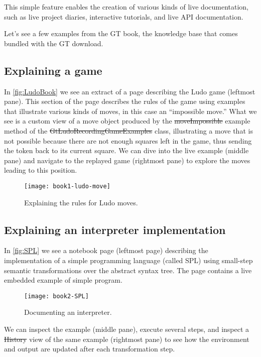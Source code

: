 \documentclass[acmsmall,screen,authorversion,nonacm]{acmart} %
\begin{document}
This simple feature enables the creation of various kinds of live documentation, such as live project diaries, interactive tutorials, and live API documentation.

Let's see a few examples from the GT book, the knowledge base that comes bundled with the GT download.

\subsection{Explaining a game}
In \autoref{fig:LudoBook} we see an extract of a page describing the Ludo game (leftmost pane).
This section of the page describes the rules of the game using examples that illustrate various kinds of moves, in this case an ``impossible move.''
What we see is a custom view of a move object produced by the \st{moveImpossible} example method of the \st{GtLudoRecordingGameExamples} class, illustrating a move that is not possible because there are not enough squares left in the game, thus sending the token back to its current square.
We can dive into the live example (middle pane) and navigate to the replayed game (rightmost pane) to explore the moves leading to this position.
\begin{figure}[h]
  \texttt{[image: book1-ludo-move]}
  \caption{Explaining the rules for Ludo moves.}
  \label{fig:LudoBook}
\end{figure}

\subsection{Explaining an interpreter implementation}
In \autoref{fig:SPL} we see a notebook page (leftmost page) describing the implementation of a simple programming language (called SPL) using small-step semantic transformations over the abstract syntax tree.
The page contains a live embedded example of simple program.
\begin{figure}[h]
  \texttt{[image: book2-SPL]}
  \caption{Documenting an interpreter.}
  \label{fig:SPL}
\end{figure}
We can inspect the example (middle pane), execute several steps, and inspect a \st{History} view of the same example (rightmost pane) to see how the environment and output are updated after each transformation step.

\end{document}

